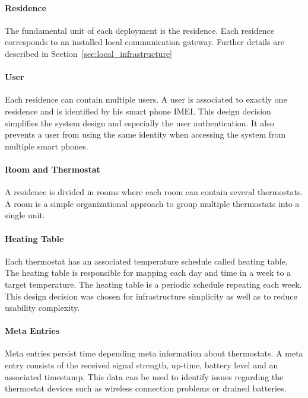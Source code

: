 
\paragraph{Residence}

The fundamental unit of each deployment is the residence. Each residence corresponds to an installed local communication gateway. Further details are described in Section~\ref{sec:local_infrastructure}

\paragraph{User}

Each residence can contain multiple users. A user is associated to exactly one residence and is identified by his smart phone IMEI. This design decision simplifies the system design and especially the user authentication. It also prevents a user from using the same identity when accessing the system from multiple smart phones.

\paragraph{Room and Thermostat}
A residence is divided in rooms where each room can contain several thermostats. A room is a simple organizational approach to group multiple thermostats into a single unit.

\paragraph{Heating Table}

Each thermostat has an associated temperature schedule called heating table.
The heating table is responsible for mapping each day and time in a week to a target temperature. The heating table is a periodic schedule repeating each week.
This design decision was chosen for infrastructure simplicity as well as to reduce usability complexity.

\paragraph{Meta Entries}

Meta entries persist time depending meta information about thermostats. A meta entry consists of the received signal strength, up-time, battery level and an associated timestamp. This data can be used to identify issues regarding the thermostat devices such as wireless connection problems or drained batteries.
